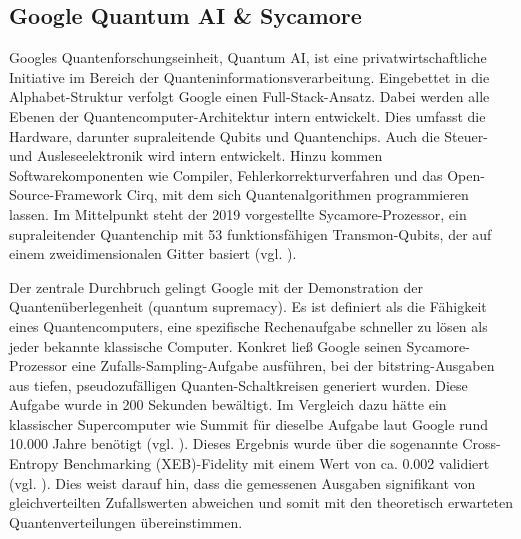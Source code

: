 \subsection*{Google Quantum AI \& Sycamore} 
\label{Chemie_Projekte_Google_Quantum_AI}

Googles Quantenforschungseinheit, Quantum AI, ist eine privatwirtschaftliche Initiative im Bereich der Quanteninformationsverarbeitung.  Eingebettet in die Alphabet-Struktur verfolgt Google einen Full-Stack-Ansatz. Dabei werden alle Ebenen der Quantencomputer-Architektur intern entwickelt. Dies umfasst die Hardware, darunter supraleitende Qubits und Quantenchips. Auch die Steuer- und Ausleseelektronik wird intern entwickelt. Hinzu kommen Softwarekomponenten wie Compiler, Fehlerkorrekturverfahren und das Open-Source-Framework Cirq, mit dem sich Quantenalgorithmen programmieren lassen. Im Mittelpunkt steht der 2019 vorgestellte Sycamore-Prozessor, ein supraleitender Quantenchip mit 53 funktionsfähigen Transmon-Qubits, der auf einem zweidimensionalen Gitter basiert (vgl. \cite{aruteQuantumSupremacyUsing2019a}).

Der zentrale Durchbruch gelingt Google mit der Demonstration der Quantenüberlegenheit (quantum supremacy). Es ist definiert als die Fähigkeit eines Quantencomputers, eine spezifische Rechenaufgabe schneller zu lösen als jeder bekannte klassische Computer. Konkret ließ Google seinen Sycamore-Prozessor eine Zufalls-Sampling-Aufgabe ausführen, bei der bitstring-Ausgaben aus tiefen, pseudozufälligen Quanten-Schaltkreisen generiert wurden. Diese Aufgabe wurde in 200 Sekunden bewältigt. Im Vergleich dazu hätte ein klassischer Supercomputer wie Summit für dieselbe Aufgabe laut Google rund 10.000 Jahre benötigt (vgl. \cite{aruteQuantumSupremacyUsing2019a}).
Dieses Ergebnis wurde über die sogenannte Cross-Entropy Benchmarking (XEB)-Fidelity mit einem Wert von ca. 0.002 validiert (vgl. \cite{maksudul_shadat_akash_quantum_2025}). Dies weist darauf hin, dass die gemessenen Ausgaben signifikant von gleichverteilten Zufallswerten abweichen und somit mit den theoretisch erwarteten Quantenverteilungen übereinstimmen.

